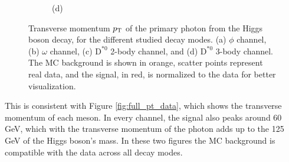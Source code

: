 \begin{figure}[!ht]
\begin{subfigure}[t]{0.50\mylength}
        \vspace*{-0.2cm}
        \caption{\footnotesize (d)}
    \end{subfigure}%
\caption{Transverse momentum $p_\text{T}$ of the primary photon from the Higgs boson decay, for the different studied decay modes. (a) $\phi$ channel, (b) $\omega$ channel, (c) $\text{D}^{*0}$ 2-body channel, and (d) $\text{D}^{*0}$ 3-body channel. The MC background is shown in orange, scatter points represent real data, and the signal, in red, is normalized to the data for better visualization.}
\label{fig:photon_pt_data}
    \vspace*{-0.0cm}
\end{figure}
This is consistent with Figure \ref{fig:full_pt_data}, which shows the transverse momentum of each meson. In every channel, the signal also peaks around 60 GeV, which with the transverse momentum of the photon adds up to the 125 GeV of the Higgs boson's mass. In these two figures the MC background is compatible with the data across all decay modes.
